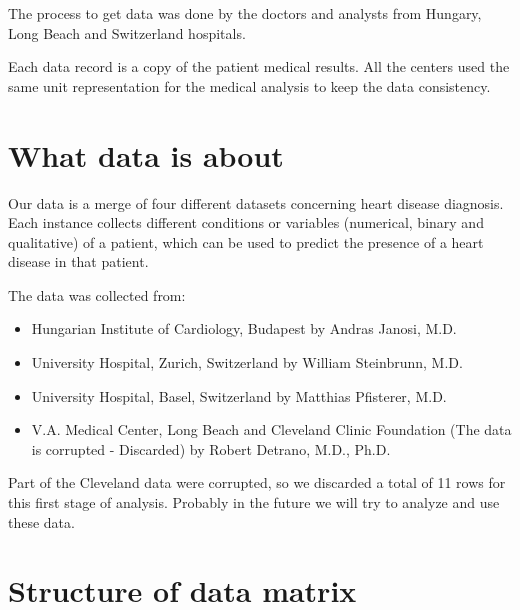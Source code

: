 \documentclass[a4paper,12pt]{article}
\begin{document}
    The process to get data was done by the doctors and analysts from Hungary, Long Beach and Switzerland hospitals.

    Each data record is a copy of the patient medical results. All the centers used the same unit representation for the medical analysis to keep the data consistency.

\section{What data is about}

    Our data is a merge of four different datasets concerning heart disease diagnosis.
    Each instance collects different conditions or variables (numerical, binary and qualitative) of a patient,
    which can be used to predict the presence of a heart disease in that patient.

    The data was collected from:

    \begin{itemize}

        \item Hungarian Institute of Cardiology, Budapest by Andras Janosi, M.D.
        \item University Hospital, Zurich, Switzerland by William Steinbrunn, M.D.
        \item University Hospital, Basel, Switzerland by Matthias Pfisterer, M.D.
        \item V.A. Medical Center, Long Beach and Cleveland Clinic Foundation (The data is corrupted - Discarded) by Robert Detrano, M.D., Ph.D.

    \end{itemize}

    Part of the Cleveland data were corrupted, so we discarded a total of 11 rows for this first stage of analysis. Probably in the future we will try to analyze and use these data.

\section{Structure of data matrix}
\end{document}
